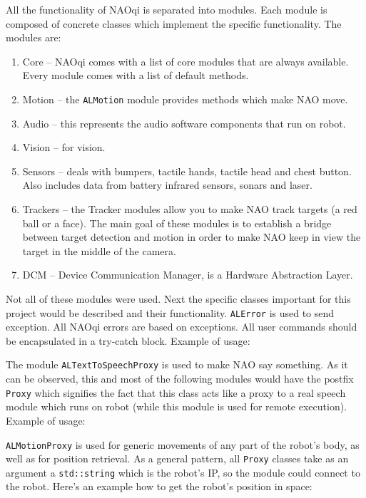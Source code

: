     All the functionality of NAOqi is separated into modules. Each module is composed of concrete classes which implement the specific functionality. The modules are:
        \begin{enumerate}[topsep=5pt, partopsep=0pt,itemsep=3pt,parsep=1pt]
            \item Core -- NAOqi comes with a list of core modules that are always available. Every module comes with a list of default methods.
            \item Motion -- the \verb|ALMotion| module provides methods which make NAO move.
            \item Audio -- this represents the audio software components that run on robot.
            \item Vision -- for vision.
            \item Sensors -- deals with bumpers, tactile hands, tactile head and chest button. Also includes data from battery infrared sensors, sonars and laser.
            \item Trackers -- the Tracker modules allow you to make NAO track targets (a red ball or a face). The main goal of these modules is to establish a bridge between target detection and motion in order to make NAO keep in view the target in the middle of the camera.
            \item DCM -- Device Communication Manager, is a Hardware Abstraction Layer.
        \end{enumerate}
        Not all of these modules were used. Next the specific classes important for this project would be described and their functionality.
        \verb|ALError| is used to send exception. All NAOqi errors are based on exceptions. All user commands should be encapsulated in a try-catch block. Example of usage:
        \renewcommand{\thelstlisting}{\thesection.\arabic{lstlisting}}
        
\vspace{5mm}
        The module \verb|ALTextToSpeechProxy| is used to make NAO say something. As it can be observed, this and most of the following modules would have the postfix \verb|Proxy| which signifies the fact that this class acts like a proxy to a real speech module which runs on robot (while this module is used for remote execution). Example of usage:
        
\vspace{5mm}
        \verb|ALMotionProxy| is used for generic movements of any part of the robot's body, as well as for position retrieval. As a general pattern, all \verb|Proxy| classes take as an argument a \verb|std::string| which is the robot's IP, so the module could connect to the robot. Here's an example how to get the robot's position in space:
